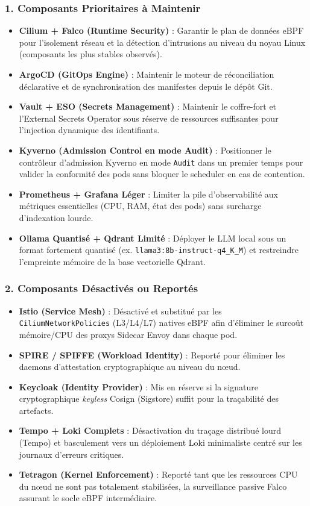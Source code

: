 \subsubsection{1. Composants Prioritaires à Maintenir}
\begin{itemize}
    \item \textbf{Cilium + Falco (Runtime Security)} : Garantir le plan de données eBPF pour l'isolement réseau et la détection d'intrusions au niveau du noyau Linux (composants les plus stables observés).
    \item \textbf{ArgoCD (GitOps Engine)} : Maintenir le moteur de réconciliation déclarative et de synchronisation des manifestes depuis le dépôt Git.
    \item \textbf{Vault + ESO (Secrets Management)} : Maintenir le coffre-fort et l'External Secrets Operator sous réserve de ressources suffisantes pour l'injection dynamique des identifiants.
    \item \textbf{Kyverno (Admission Control en mode Audit)} : Positionner le contrôleur d'admission Kyverno en mode \texttt{Audit} dans un premier temps pour valider la conformité des pods sans bloquer le scheduler en cas de contention.
    \item \textbf{Prometheus + Grafana Léger} : Limiter la pile d'observabilité aux métriques essentielles (CPU, RAM, état des pods) sans surcharge d'indexation lourde.
    \item \textbf{Ollama Quantisé + Qdrant Limité} : Déployer le LLM local sous un format fortement quantisé (ex. \texttt{llama3:8b-instruct-q4\_K\_M}) et restreindre l'empreinte mémoire de la base vectorielle Qdrant.
\end{itemize}

\subsubsection{2. Composants Désactivés ou Reportés}
\begin{itemize}
    \item \textbf{Istio (Service Mesh)} : Désactivé et substitué par les \texttt{CiliumNetworkPolicies} (L3/L4/L7) natives eBPF afin d'éliminer le surcoût mémoire/CPU des proxys Sidecar Envoy dans chaque pod.
    \item \textbf{SPIRE / SPIFFE (Workload Identity)} : Reporté pour éliminer les daemons d'attestation cryptographique au niveau du nœud.
    \item \textbf{Keycloak (Identity Provider)} : Mis en réserve si la signature cryptographique \textit{keyless} Cosign (Sigstore) suffit pour la traçabilité des artefacts.
    \item \textbf{Tempo + Loki Complets} : Désactivation du traçage distribué lourd (Tempo) et basculement vers un déploiement Loki minimaliste centré sur les journaux d'erreurs critiques.
    \item \textbf{Tetragon (Kernel Enforcement)} : Reporté tant que les ressources CPU du nœud ne sont pas totalement stabilisées, la surveillance passive Falco assurant le socle eBPF intermédiaire.
\end{itemize}

